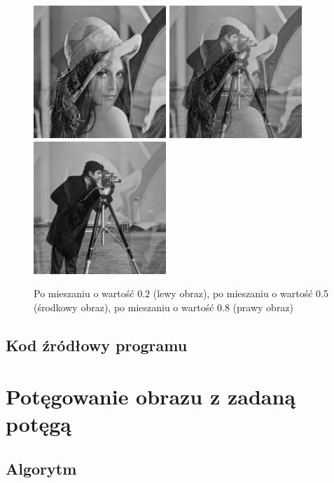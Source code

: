 \documentclass[a4paper,12pt]{book}
\begin{document}
\begin{figure}[H]
	\caption{Po mieszaniu o wartość 0.2 (lewy obraz), po mieszaniu o wartość 0.5 (środkowy obraz), po mieszaniu o wartość 0.8 (prawy obraz)}
	\includegraphics[width=5cm, height=5cm]{2/blend-gray-images-2.png}
	\includegraphics[width=5cm, height=5cm]{2/blend-gray-images-5.png}
	\includegraphics[width=5cm, height=5cm]{2/blend-gray-images-8.png}
\end{figure}

\subsection*{Kod źródłowy programu}

\section{Potęgowanie obrazu z zadaną potęgą}
\subsection*{Algorytm}
\end{document}
